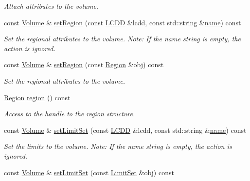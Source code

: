 \begin{DoxyCompactItemize}
\begin{DoxyCompactList}\small\item\em Attach attributes to the volume. \end{DoxyCompactList}\item 
const \hyperlink{class_d_d4hep_1_1_geometry_1_1_volume}{Volume} \& \hyperlink{class_d_d4hep_1_1_geometry_1_1_volume_a53f47176e37d1828ff96af28fdf006fe}{set\+Region} (const \hyperlink{class_d_d4hep_1_1_geometry_1_1_l_c_d_d}{L\+C\+DD} \&lcdd, const std\+::string \&\hyperlink{class_d_d4hep_1_1_handle_a27c7d467a609ab32c133e1f3c7d85ef5}{name}) const
\begin{DoxyCompactList}\small\item\em Set the regional attributes to the volume. Note\+: If the name string is empty, the action is ignored. \end{DoxyCompactList}\item 
const \hyperlink{class_d_d4hep_1_1_geometry_1_1_volume}{Volume} \& \hyperlink{class_d_d4hep_1_1_geometry_1_1_volume_a8b969e96fd80af17255ea25b993c47bf}{set\+Region} (const \hyperlink{class_d_d4hep_1_1_geometry_1_1_region}{Region} \&obj) const
\begin{DoxyCompactList}\small\item\em Set the regional attributes to the volume. \end{DoxyCompactList}\item 
\hyperlink{class_d_d4hep_1_1_geometry_1_1_region}{Region} \hyperlink{class_d_d4hep_1_1_geometry_1_1_volume_a5fda2a86ec792e7fe38d7e63b0c939e8}{region} () const
\begin{DoxyCompactList}\small\item\em Access to the handle to the region structure. \end{DoxyCompactList}\item 
const \hyperlink{class_d_d4hep_1_1_geometry_1_1_volume}{Volume} \& \hyperlink{class_d_d4hep_1_1_geometry_1_1_volume_ace16eeb3999b91c056b5fd809054b4bd}{set\+Limit\+Set} (const \hyperlink{class_d_d4hep_1_1_geometry_1_1_l_c_d_d}{L\+C\+DD} \&lcdd, const std\+::string \&\hyperlink{class_d_d4hep_1_1_handle_a27c7d467a609ab32c133e1f3c7d85ef5}{name}) const
\begin{DoxyCompactList}\small\item\em Set the limits to the volume. Note\+: If the name string is empty, the action is ignored. \end{DoxyCompactList}\item 
const \hyperlink{class_d_d4hep_1_1_geometry_1_1_volume}{Volume} \& \hyperlink{class_d_d4hep_1_1_geometry_1_1_volume_a41b38dd29fcb65f7bc168127d35cdff3}{set\+Limit\+Set} (const \hyperlink{class_d_d4hep_1_1_geometry_1_1_limit_set}{Limit\+Set} \&obj) const

\end{DoxyCompactItemize}
